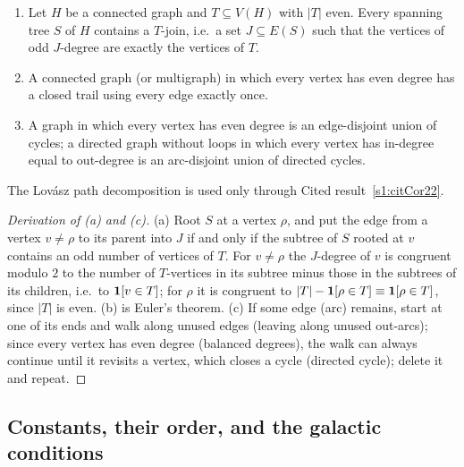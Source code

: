 \begin{citedresult}\label{s1:citEuler}
\begin{enumerate}
\item[(a)] Let $H$ be a connected graph and $T\subseteq V(H)$ with $|T|$ even.
Every spanning tree $S$ of $H$ contains a $T$-join, i.e.\ a set $J\subseteq E(S)$
such that the vertices of odd $J$-degree are exactly the vertices of $T$.
\item[(b)] A connected graph (or multigraph) in which every vertex has even degree
has a closed trail using every edge exactly once.
\item[(c)] A graph in which every vertex has even degree is an edge-disjoint union
of cycles; a directed graph without loops in which every vertex has in-degree
equal to out-degree is an arc-disjoint union of directed cycles.
\end{enumerate}
The Lov\'asz path decomposition is used only through Cited
result~\ref{s1:citCor22}.
\end{citedresult}
\begin{proof}[Derivation of (a) and (c)]
(a) Root $S$ at a vertex $\rho$, and put the edge from a vertex $v\ne\rho$ to its
parent into $J$ if and only if the subtree of $S$ rooted at $v$ contains an odd
number of vertices of $T$. For $v\ne\rho$ the $J$-degree of $v$ is congruent
modulo $2$ to the number of $T$-vertices in its subtree minus those in the
subtrees of its children, i.e.\ to $\mathbf{1}[v\in T]$; for $\rho$ it is congruent to
$|T|-\mathbf{1}[\rho\in T]\equiv\mathbf{1}[\rho\in T]$, since $|T|$ is even. (b) is Euler's
theorem. (c) If some edge (arc) remains, start at one of its ends and walk along
unused edges (leaving along unused out-arcs); since every vertex has even degree
(balanced degrees), the walk can always continue until it revisits a vertex,
which closes a cycle (directed cycle); delete it and repeat.
\end{proof}

\subsection{Constants, their order, and the galactic conditions}\label{s1:ssecConstants}

